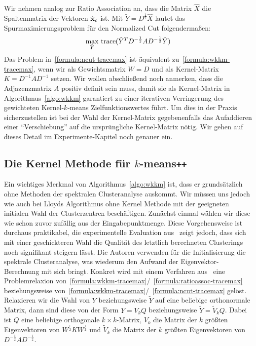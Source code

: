 Wir nehmen analog zur Ratio Association an, dass die Matrix $\hat{X}$ die Spaltenmatrix der Vektoren $\hat{\mathbf{x}}_c$ ist.
Mit $\tilde{Y} = D^\frac{1}{2} \hat{X}$ lautet das Spurmaximierungsproblem für den Normalized Cut folgendermaßen:
\begin{align}
\label{formula:ncut-tracemax}
	\max_{\tilde{Y}}{} \operatorname*{trace}( \tilde{Y}^T D^{-\frac{1}{2}} A D^{-\frac{1}{2}} \tilde{Y} )
\end{align}
Das Problem in~\ref{formula:ncut-tracemax} ist äquivalent zu~\ref{formula:wkkm-tracemax}, wenn wir als
Gewichtsmatrix $W = D$ und als Kernel-Matrix $K = D^{-1} A D^{-1}$ setzen.
\absatz
Wir wollen abschließend noch anmerken, dass die Adjazenzmatrix $A$ positiv definit sein muss, damit sie als Kernel-Matrix in
Algorithmus~\ref{algo:wkkm} garantiert zu einer iterativen Verringerung des gewichteten Kernel-$k$-means Zielfunktionswertes
führt. Um dies in der Praxis sicherzustellen ist bei der Wahl der Kernel-Matrix gegebenenfalls das Aufaddieren einer
"`Verschiebung"' auf die ursprüngliche Kernel-Matrix nötig. Wir gehen auf dieses Detail im Experimente-Kapitel noch genauer ein.

\subsection{Die Kernel Methode für \texorpdfstring{$k$}{k}-means\texttt{++}}
\label{subsection:kernelkmpp}

Ein wichtiges Merkmal von Algorithmus~\ref{algo:wkkm} ist, dass er grundsätzlich ohne Methoden der spektralen Clusteranalyse
auskommt. Wir müssen uns jedoch wie auch bei Lloyds Algorithmus ohne Kernel Methode mit der geeigneten initialen Wahl
der Clusterzentren beschäftigen. Zunächst einmal wählen wir diese wie schon zuvor zufällig aus der Eingabepunktmenge.
Diese Vorgehensweise ist durchaus praktikabel, die experimentelle Evaluation aus~\citep{DhillonGK04,DhillonGK07} zeigt jedoch,
dass sich mit einer geschickteren Wahl die Qualität des letztlich berechneten Clusterings noch signifikant steigern lässt.
Die Autoren verwenden für die Initialisierung die spektrale Clusteranalyse, was wiederum den Aufwand der Eigenvektor-Berechnung
mit sich bringt.
\absatz
Konkret wird mit einem Verfahren aus~\cite{GolubL96} eine Problemrelaxion
von~\ref{formula:wkkm-tracemax}/~\ref{formula:ratioassoc-tracemax} beziehungsweise
von~\ref{formula:wkkm-tracemax}/~\ref{formula:ncut-tracemax} gelöst.
Relaxieren wir die Wahl von $Y$ beziehungsweise $\tilde{Y}$ auf eine beliebige
orthonormale Matrix, dann sind diese von der Form $Y = V_k Q$ beziehungsweise $\tilde{Y} = \tilde{V}_k Q$.
Dabei ist $Q$ eine beliebige orthogonale $k \times k$-Matrix, $V_k$ die Matrix der $k$ größten Eigenvektoren von
$W^{\frac{1}{2}} K W^{\frac{1}{2}}$ und $\tilde{V}_k$ die Matrix der $k$ größten Eigenvektoren von
$D^{-\frac{1}{2}} A D^{-\frac{1}{2}}$.

